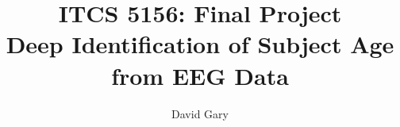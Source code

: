\documentclass[letterpaper,twocolumn,10pt]{article}
\title{ITCS 5156: Final Project\\Deep Identification of Subject Age from EEG Data}
\author{David Gary}
\begin{document}
\maketitle



{
  \small
  
  
}
\end{document}
